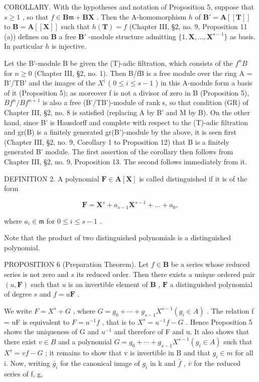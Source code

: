 COROLLARY. With the hypotheses and notation of Proposition 5, suppose that \(s \geqslant 1\) , so that \(f \in \mathbf{B}\mathfrak{m} + \mathbf{B}\mathbf{X}\) . Then the A-homomorphism \(h\) of \(\mathbf{B}' = \mathbf{A}[[\mathbf{T}]]\) to \(\mathbf{B} = \mathbf{A}[[\mathbf{X}]]\) such that \(h(\mathbf{T}) = f\) (Chapter III, §2, no. 9, Proposition 11 (a)) defines on \(\mathbf{B}\) a free \(\mathbf{B}'\) -module structure admitting \(\{1, \mathbf{X}, \ldots, \mathbf{X}^{s-1}\}\) as basis. In particular \(h\) is injective.

Let the B'-module B be given the (T)-adic filtration, which consists of the \(f^{n}B\) for \(n \geqslant 0\) (Chapter III, §2, no. 1). Then B/fB is a free module over the ring A = B'/TB' and the images of the \(X^{i}\) ( \(0 \leqslant i \leqslant s - 1\) ) in this A-module form a basis of it (Proposition 5); as moreover f is not a divisor of zero in B (Proposition 5), \(Bf^{n}/Bf^{n+1}\) is also a free (B'/TB')-module of rank s, so that condition (GR) of Chapter III, §2, no. 8 is satisfied (replacing A by B' and M by B). On the other hand, since B' is Hausdorff and complete with respect to the (T)-adic filtration and gr(B) is a finitely generated gr(B')-module by the above, it is seen first (Chapter III, §2, no. 9, Corollary 1 to Proposition 12) that B is a finitely generated B' module. The first assertion of the corollary then follows from Chapter III, §2, no. 9, Proposition 13. The second follows immediately from it.

DEFINITION 2. A polynomial \(\mathbf{F} \in \mathbf{A}[\mathbf{X}]\) is called distinguished if it is of the form

\[
\mathbf {F} = \mathbf {X} ^ {s} + a _ {s - 1} \mathbf {X} ^ {s - 1} + \dots + a _ {0},
\]

where \(a_{i} \in \mathfrak{m}\) for \(0 \leqslant i \leqslant s - 1\) .

Note that the product of two distinguished polynomials is a distinguished polynomial.

PROPOSITION 6 (Preparation Theorem). Let \(f \in \mathbf{B}\) be a series whose reduced series is not zero and \(s\) its reduced order. Then there exists a unique ordered pair \((u, \mathbf{F})\) such that \(u\) is an invertible element of \(\mathbf{B}\) , \(\mathbf{F}\) a distinguished polynomial of degree \(s\) and \(f = u\mathbf{F}\) .

We write \(F = X^{s} + G\) , where \(G = g_{0} + \cdots + g_{s-1}X^{s-1} (g_{i} \in A)\) . The relation f = uF is equivalent to \(F = u^{-1}f\) , that is to \(X^{s} = u^{-1}f - G\) . Hence Proposition 5 shows the uniqueness of G and \(u^{-1}\) and therefore of F and u. It also shows that there exist \(v \in B\) and a polynomial \(G = g_{0} + \cdots + g_{s-1}X^{s-1} (g_{i} \in A)\) such that \(X^{s} = vf - G\) ; it remains to show that v is invertible in B and that \(g_{i} \in m\) for all i. Now, writing \(\bar{g}_{i}\) for the canonical image of \(g_{i}\) in k and \(\bar{f}\) , \(\bar{v}\) for the reduced series of f, g,

